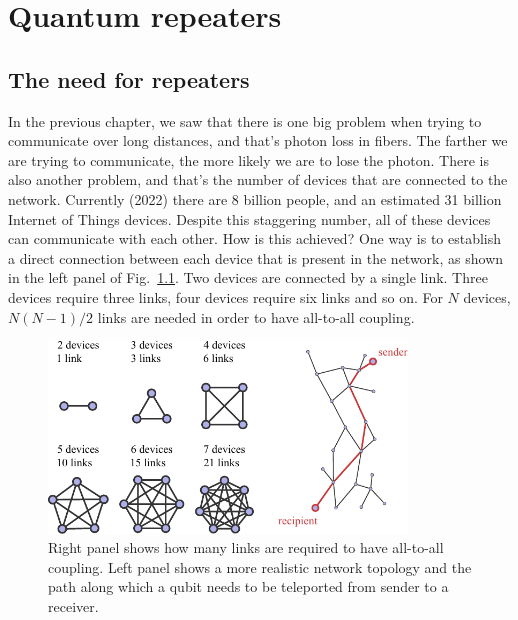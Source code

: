 \chapter{Quantum repeaters}
\label{sec:12_quantum_repeaters}
\label{ch:repeaters}

\section{The need for repeaters}
\label{sec:12-1_need_for_repeaters}

In the previous chapter, we saw that there is one big problem when trying to communicate over long distances, and that's photon loss in fibers.
The farther we are trying to communicate, the more likely we are to lose the photon.
There is also another problem, and that's the number of devices that are connected to the network. Currently (2022) there are 8 billion people, and an estimated 31 billion Internet of Things devices.
Despite this staggering number, all of these devices can communicate with each other.
How is this achieved?
One way is to establish a direct connection between each device that is present in the network, as shown in the left panel of Fig.~\ref{fig:12-1_all_to_all}.
Two devices are connected by a single link.
Three devices require three links, four devices require six links and so on.
For $N$ devices, $N (N - 1) / 2$ links are needed in order to have all-to-all coupling.

\begin{figure}[t]
    \centering
    \includegraphics[width=0.85\textwidth]{lesson12/12-1_all_to_all.pdf}
    \caption[All-to-all coupling]{Right panel shows how many links are required to have all-to-all coupling. Left panel shows a more realistic network topology and the path along which a qubit needs to be teleported from sender to a receiver.}
    \label{fig:12-1_all_to_all}
\end{figure}

